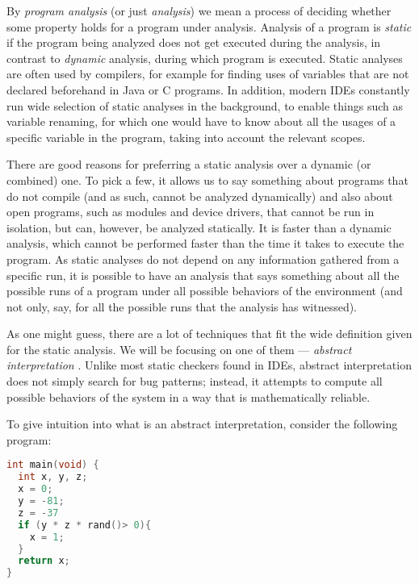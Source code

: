 \documentclass[..thesis.tex]{subfiles}
\begin{document}

By \textit{program analysis} (or just \textit{analysis}) we mean a process of deciding whether some property holds for a program under analysis.
Analysis of a program is \textit{static} if the program being analyzed does not get executed during the analysis, in contrast to \textit{dynamic} analysis,
during which program is executed. Static analyses are often used by compilers, for example for finding uses of variables that are not declared beforehand
in Java or C programs. In addition, modern IDEs constantly run wide selection of static analyses in the background, to enable things such as variable renaming,
for which one would have to know about all the usages of a specific variable in the program, taking into account the relevant scopes. 



There are good reasons for preferring a static analysis over a dynamic (or combined) one.
To pick a few, it allows us to say something about programs that do not compile (and as such, cannot be analyzed dynamically) and also about open programs,
such as modules and device drivers, that cannot be run in isolation, but can, however, be analyzed statically.  
It is faster than a dynamic analysis, which cannot be performed faster than the time it takes to execute the program.
As static analyses do not depend on any information gathered from a specific run, it is possible to have an analysis that says something
about all the possible runs of a program under all possible behaviors of the environment (and not only, say, for all the possible runs that the analysis has witnessed).



As one might guess, there are a lot of techniques that fit the wide definition given for the static analysis.
We will be focusing on one of them --- \textit{abstract interpretation} \cite{cousot_abstract_1977}. 
Unlike most static checkers found in IDEs, abstract interpretation does not simply search for bug patterns; instead,
it attempts to compute all possible behaviors of the system in a way that is mathematically reliable.



To give intuition into what is an abstract interpretation, consider the following program:

\begin{lstlisting}[language=C,style=def]
int main(void) {
  int x, y, z;
  x = 0;
  y = -81;
  z = -37
  if (y * z * rand()> 0){
    x = 1;
  }
  return x;
}
\end{lstlisting}
\end{document}
